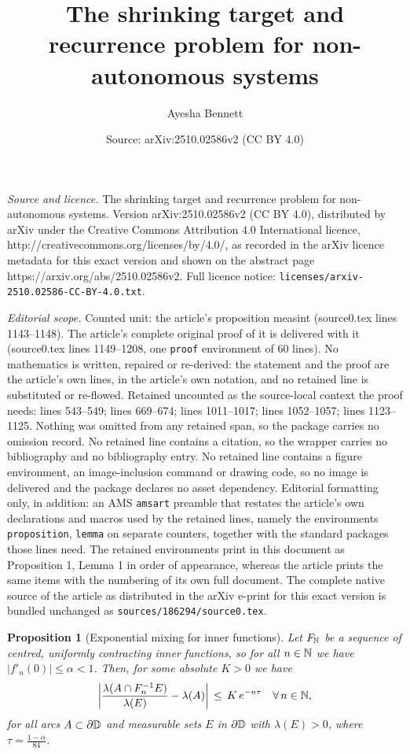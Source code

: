 \documentclass[10pt,a4paper]{amsart}
\title{The shrinking target and recurrence problem for non-autonomous systems}
\author{Ayesha Bennett}
\date{Source: arXiv:2510.02586v2 (CC BY 4.0)}
\newtheorem{proposition}{Proposition}
\newcommand{\D}{{\Bbb D}}
\newcommand{\N}{{\Bbb N}}
\begin{document}
\maketitle

\noindent\emph{Source and licence.} The shrinking target and recurrence problem for non-autonomous systems. Version arXiv:2510.02586v2 (CC BY 4.0), distributed by arXiv under the Creative Commons Attribution 4.0 International licence, http://creativecommons.org/licenses/by/4.0/, as recorded in the arXiv licence metadata for this exact version and shown on the abstract page https://arxiv.org/abs/2510.02586v2. Full licence notice: \texttt{licenses/arxiv-2510.02586-CC-BY-4.0.txt}.\par\smallskip

\noindent\textit{Editorial scope.} Counted unit: the article's proposition measint (source0.tex lines 1143--1148). The article's complete original proof of it is delivered with it (source0.tex lines 1149--1208, one \texttt{proof} environment of 60 lines). No mathematics is written, repaired or re-derived: the statement and the proof are the article's own lines, in the article's own notation, and no retained line is substituted or re-flowed.  Retained uncounted as the source-local context the proof needs: lines 543--549; lines 669--674; lines 1011--1017; lines 1052--1057; lines 1123--1125.  Nothing was omitted from any retained span, so the package carries no omission record.  No retained line contains a citation, so the wrapper carries no bibliography and no bibliography entry.  No retained line contains a figure environment, an image-inclusion command or drawing code, so no image is delivered and the package declares no asset dependency.  Editorial formatting only, in addition: an AMS \texttt{amsart} preamble that restates the article's own declarations and macros used by the retained lines, namely the environments \texttt{proposition}, \texttt{lemma} on separate counters, together with the standard packages those lines need.  The retained environments print in this document as Proposition 1, Lemma 1 in order of appearance, whereas the article prints the same items with the numbering of its own full document.  The complete native source of the article as distributed in the arXiv e-print for this exact version is bundled unchanged as \texttt{sources/186294/source0.tex}.
 \begin{proposition}[Exponential mixing for inner functions] \label{expmixcomp}
 Let $F_\N$ be a sequence of centred, uniformly contracting inner functions, so for all $n \in \N$ we have $|f'_n(0)| \leq \alpha <1$. Then, for some absolute $K > 0$ we have
 \begin{equation}\label{exppom}
   \left|\frac{\lambda(A\cap F_n^{-1}E)}{\lambda(E)}-\lambda(A)\right| \,  \le  \,  K \, e^{- n\tau}     \quad  \forall \, n \in \N,
\end{equation}
for all arcs $A \subset \partial\D$ and measurable sets $E$ in $\partial\D$ with $\lambda(E) > 0 $, where $\tau= \frac{1-\alpha}{84} $.
 \end{proposition}
\end{document}
